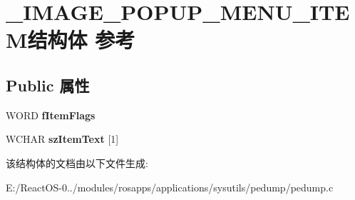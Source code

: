 \hypertarget{struct___i_m_a_g_e___p_o_p_u_p___m_e_n_u___i_t_e_m}{}\section{\+\_\+\+I\+M\+A\+G\+E\+\_\+\+P\+O\+P\+U\+P\+\_\+\+M\+E\+N\+U\+\_\+\+I\+T\+E\+M结构体 参考}
\label{struct___i_m_a_g_e___p_o_p_u_p___m_e_n_u___i_t_e_m}
\subsection*{Public 属性}
\begin{DoxyCompactItemize}
\item 
\mbox{\label{struct___i_m_a_g_e___p_o_p_u_p___m_e_n_u___i_t_e_m_aa24addd50117aedfc16ee80cca68a756}} 
W\+O\+RD {\bfseries f\+Item\+Flags}
\item 
\mbox{\label{struct___i_m_a_g_e___p_o_p_u_p___m_e_n_u___i_t_e_m_a35ac1407d171bf38707973ecafd63fbe}} 
W\+C\+H\+AR {\bfseries sz\+Item\+Text} \mbox{[}1\mbox{]}
\end{DoxyCompactItemize}


该结构体的文档由以下文件生成\+:\begin{DoxyCompactItemize}
\item 
E\+:/\+React\+O\+S-\/0../modules/rosapps/applications/sysutils/pedump/pedump.\+c\end{DoxyCompactItemize}
